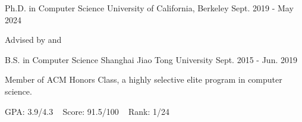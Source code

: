 
\begin{cventries}

  \cventry
	{Ph.D. in Computer Science} %
	{University of California, Berkeley} %
	{Sept. 2019 - May 2024} %
	{} %
	{
		\begin{cvitems} %
			\item {Advised by  and }
		\end{cvitems}
	}

  \cventry
    {B.S. in Computer Science} %
    {Shanghai Jiao Tong University} %
    {Sept. 2015 - Jun. 2019} %
    {} %
    {
    \begin{cvitems} %
    	\item {Member of ACM Honors Class, a highly selective elite program in computer science.}
    	\item {GPA: 3.9/4.3 ~ Score: 91.5/100 ~ Rank: 1/24}
    \end{cvitems}
    }

\end{cventries}
